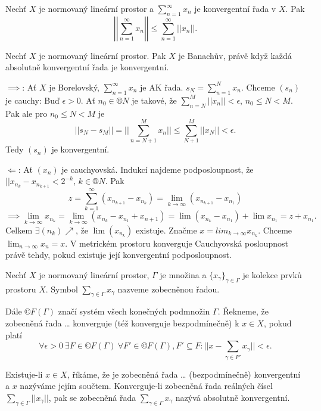 \documentclass[12pt]{article}					%
\begin{document}
\begin{poznamka}[Fakt]
	Nechť $X$ je normovaný lineární prostor a $\sum_{n = 1}^∞ x_n$ je konvergentní řada v $X$. Pak
	$$ \left|\left| \sum_{n=1}^∞ x_n \right|\right| ≤ \sum_{n=1}^∞ ||x_n||. $$
\end{poznamka}

\begin{veta}
	Nechť $X$ je normovaný lineární prostor. Pak $X$ je Banachův, právě když každá absolutně konvergentní řada je konvergentní.

	\begin{dukazin}
		$\implies$: Ať $X$ je Borelovský, $\sum_{n=1}^∞ x_n$ je AK řada. $s_N = \sum_{n=1}^N x_n$. Chceme $(s_n)$ je cauchy: Buď $\epsilon > 0$. Ať $n_0 \in ®N$ je takové, že $\sum_{n=N}^M ||x_n|| < \epsilon$, $n_0 ≤ N < M$. Pak ale pro $n_0 ≤ N < M$ je
		$$ ||s_N - s_M|| = ||\sum_{n=N+1}^M x_n|| ≤ \sum_{N+1}^M||x_N|| < \epsilon. $$
		Tedy $(s_n)$ je konvergentní.

		$\Leftarrow$: Ať $(x_n)$ je cauchyovská. Indukcí najdeme podposloupnost, že $||x_{n_k} - x_{n_{k+1}} < 2^{-k}$, $k \in ®N$. Pak
		$$ z = \sum_{k=1}^∞(x_{n_{k+1}} - x_{n_k}) = \lim_{k \rightarrow ∞}(x_{n_{k+1}} - x_{n_1}) $$
		$$ \implies \lim_{k \rightarrow ∞} x_{n_k} = \lim_{k \rightarrow ∞} (x_{n_k} - x_{n_1} + x_{n+1}) = \lim(x_{n_k} - x_{n_1}) + \lim x_{n_1} = z + x_{n_1}. $$
		Celkem $\exists (n_k) \nearrow$, že $\lim(x_{n_k})$ existuje. Značme $x = lim_{k \rightarrow ∞} x_{n_k}$.
		Chceme $\lim_{n \rightarrow ∞} x_n = x$. V metrickém prostoru konverguje Cauchyovská posloupnost právě tehdy, pokud existuje její konvergentní podposloupnost.
	\end{dukazin}
\end{veta}

\begin{definice}
	Nechť $X$ je normovaný lineární prostor, $\Gamma$ je množina a $\{x_\gamma\}_{\gamma \in \Gamma}$ je kolekce prvků prostoru $X$. Symbol $\sum_{\gamma \in \Gamma} x_\gamma$ nazveme zobecněnou řadou.

	Dále $©F(\Gamma)$ značí systém všech konečných podmnožin $\Gamma$. Řekneme, že zobecněná řada … konverguje (též konverguje bezpodmínečně) k $x \in X$, pokud platí
	$$ \forall \epsilon > 0\ \exists F \in ©F(\Gamma)\ \forall F' \in ©F(\Gamma), F' \subseteq F: ||x - \sum_{\gamma \in F'} x_\gamma|| < \epsilon. $$

	Existuje-li $x \in X$, říkáme, že je zobecněná řada … (bezpodmínečně) konvergentní a $x$ nazýváme jejím součtem. Konverguje-li zobecněná řada reálných čísel $\sum_{\gamma \in \Gamma} ||x_\gamma||$, pak se zobecněná řada $\sum_{\gamma \in \Gamma} x_\gamma$ nazývá absolutně konvergentní.
\end{definice}
\end{document}

